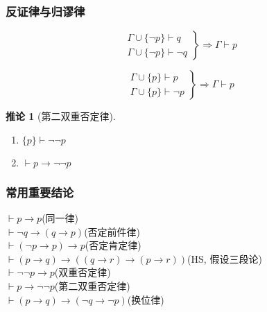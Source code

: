 \documentclass[
    color=black,
    device=normal,
    lang=cn
]{elegantnote}
\newtheorem{deduction}{推论}[subsection]
\begin{document}
\subsubsection{反证律与归谬律}
\begin{theorem}[反证律]
    $$
        \left.
        \begin{matrix}
            \Gamma\cup\{\lnot p\}\vdash q \\
            \Gamma\cup\{\lnot p\}\vdash\lnot q
        \end{matrix}
        \right\}\Rightarrow \Gamma\vdash p
    $$
\end{theorem}
\begin{theorem}[归谬律]
    $$
        \left.
        \begin{matrix}
            \Gamma\cup\{p\}\vdash p \\
            \Gamma\cup\{p\}\vdash\lnot p
        \end{matrix}
        \right\}\Rightarrow \Gamma\vdash p
    $$
\end{theorem}
\begin{deduction}[第二双重否定律]
    \begin{enumerate}[label=$\arabic*^\circ$, topsep = -1em]
        \item $\{p\}\vdash\lnot\lnot p$
        \item $\vdash p\to \lnot\lnot p$
    \end{enumerate}
\end{deduction}

\subsubsection{常用重要结论}
\noindent$\vdash p\to p$\hfill (同一律)\\
$\vdash \lnot q\to(q\to p)$\hfill (否定前件律)\\
$\vdash (\lnot p\to p)\to p$\hfill (否定肯定律)\\
$\vdash (p\to q)\to((q\to r)\to (p\to r))$\hfill (HS, 假设三段论)\\
$\vdash \lnot\lnot p\to p$\hfill (双重否定律)\\
$\vdash p\to \lnot \lnot p$\hfill (第二双重否定律)\\
$\vdash (p\to q)\to (\lnot q\to \lnot p)$\hfill (换位律)
\end{document}
